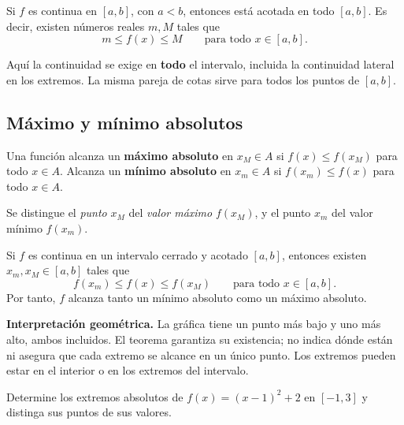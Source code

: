 \documentclass[10pt,a5paper]{article}
\newif\ifmostrarSoluciones
\begin{document}
\begin{teorema}
Si $f$ es continua en $[a,b]$, con $a<b$, entonces está acotada en todo $[a,b]$. Es decir, existen números reales $m,M$ tales que
\[
  m\leq f(x)\leq M\qquad\text{para todo }x\in[a,b].
\]
\end{teorema}

Aquí la continuidad se exige en \textbf{todo} el intervalo, incluida la continuidad lateral en los extremos. La misma pareja de cotas sirve para todos los puntos de $[a,b]$.

\subsection*{Máximo y mínimo absolutos}

\begin{definicion}
Una función alcanza un \textbf{máximo absoluto} en $x_M\in A$ si $f(x)\leq f(x_M)$ para todo $x\in A$. Alcanza un \textbf{mínimo absoluto} en $x_m\in A$ si $f(x_m)\leq f(x)$ para todo $x\in A$.

Se distingue el \emph{punto} $x_M$ del \emph{valor máximo} $f(x_M)$, y el punto $x_m$ del valor mínimo $f(x_m)$.
\end{definicion}

\begin{teorema}
Si $f$ es continua en un intervalo cerrado y acotado $[a,b]$, entonces existen $x_m,x_M\in[a,b]$ tales que
\[
  f(x_m)\leq f(x)\leq f(x_M)
  \qquad\text{para todo }x\in[a,b].
\]
Por tanto, $f$ alcanza tanto un mínimo absoluto como un máximo absoluto.
\end{teorema}

\textbf{Interpretación geométrica.} La gráfica tiene un punto más bajo y uno más alto, ambos incluidos. El teorema garantiza su existencia; no indica dónde están ni asegura que cada extremo se alcance en un único punto. Los extremos pueden estar en el interior o en los extremos del intervalo.

\begin{ejemplo}
Determine los extremos absolutos de $f(x)=(x-1)^2+2$ en $[-1,3]$ y distinga sus puntos de sus valores.
\end{ejemplo}
\ifmostrarSoluciones
\begin{solucion}
La función es continua en el intervalo cerrado y acotado, por lo que alcanza ambos extremos. Para $-1\leq x\leq3$, se tiene $-2\leq x-1\leq2$ y
\[
  0\leq(x-1)^2\leq4,
  \qquad 2\leq f(x)\leq6.
\]
El mínimo absoluto es $2$, alcanzado en $x=1$. El máximo absoluto es $6$, alcanzado en dos puntos: $x=-1$ y $x=3$.
\end{solucion}
\else\vspace{22mm}\fi
\end{document}
